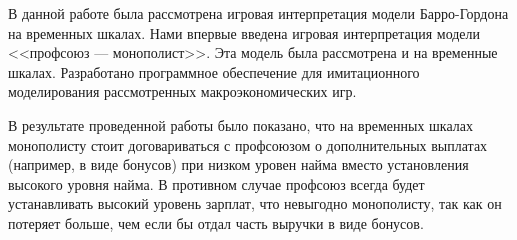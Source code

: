 
В данной работе была рассмотрена игровая интерпретация модели Барро-Гордона на
временных шкалах.  Нами впервые введена игровая интерпретация модели <<профсоюз
--- монополист>>. Эта модель была рассмотрена и на временные шкалах.
Разработано программное обеспечение для имитационного моделирования
рассмотренных макроэкономических игр. 

В результате проведенной работы было показано, что на временных шкалах
монополисту стоит договариваться с профсоюзом о дополнительных выплатах
(например, в виде бонусов) при низком уровен найма вместо установления высокого
уровня найма.  В противном случае профсоюз всегда будет устанавливать высокий
уровень зарплат, что невыгодно монополисту, так как он потеряет больше, чем
если бы отдал часть выручки в виде бонусов.
